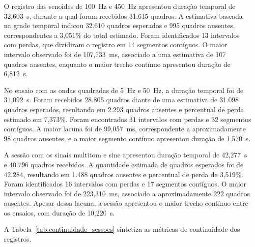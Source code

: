 \documentclass[a4paper,12pt]{fcte}
\begin{document}
O registro das senoides de 100~Hz e 450~Hz apresentou duração temporal de 32,603~s, durante a qual foram recebidos 31.615 quadros. A estimativa baseada na grade temporal indicou 32.610 quadros esperados e 995 quadros ausentes, correspondentes a 3,051\% do total estimado. Foram identificados 13 intervalos com perdas, que dividiram o registro em 14 segmentos contíguos. O maior intervalo observado foi de 107,733~ms, associado a uma estimativa de 107 quadros ausentes, enquanto o maior trecho contínuo apresentou duração de 6,812~s.

No ensaio com as ondas quadradas de 5~Hz e 50~Hz, a duração temporal foi de 31,092~s. Foram recebidos 28.805 quadros diante de uma estimativa de 31.098 quadros esperados, resultando em 2.293 quadros ausentes e percentual de perda estimado em 7,373\%. Foram encontrados 31 intervalos com perdas e 32 segmentos contíguos. A maior lacuna foi de 99,057~ms, correspondente a aproximadamente 98 quadros ausentes, e o maior segmento contínuo apresentou duração de 1,570~s.

A sessão com os sinais multitom e sinc apresentou duração temporal de 42,277~s e 40.796 quadros recebidos. A quantidade estimada de quadros esperados foi de 42.284, resultando em 1.488 quadros ausentes e percentual de perda de 3,519\%. Foram identificados 16 intervalos com perdas e 17 segmentos contíguos. O maior intervalo observado foi de 223,310~ms, associado a aproximadamente 222 quadros ausentes. Apesar dessa lacuna, a sessão apresentou o maior trecho contínuo entre os ensaios, com duração de 10,220~s.

A Tabela~\ref{tab:continuidade_sessoes} sintetiza as métricas de continuidade dos registros.
\end{document}

